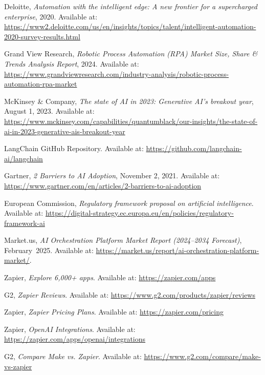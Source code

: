 \documentclass[11pt, a4paper, oneside]{article}
\begin{document}
\begin{thebibliography}{99}
    Deloitte, \textit{Automation with the intelligent edge: A new frontier for a supercharged enterprise}, 2020. Available at: \url{https://www2.deloitte.com/us/en/insights/topics/talent/intelligent-automation-2020-survey-results.html}

    Grand View Research, \textit{Robotic Process Automation (RPA) Market Size, Share \& Trends Analysis Report}, 2024. Available at: \url{https://www.grandviewresearch.com/industry-analysis/robotic-process-automation-rpa-market}

    McKinsey \& Company, \textit{The state of AI in 2023: Generative AI’s breakout year}, August 1, 2023. Available at: \url{https://www.mckinsey.com/capabilities/quantumblack/our-insights/the-state-of-ai-in-2023-generative-ais-breakout-year}


    LangChain GitHub Repository. Available at: \url{https://github.com/langchain-ai/langchain}

    Gartner, \textit{2 Barriers to AI Adoption}, November 2, 2021. Available at: \url{https://www.gartner.com/en/articles/2-barriers-to-ai-adoption}

    European Commission, \textit{Regulatory framework proposal on artificial intelligence}. Available at: \url{https://digital-strategy.ec.europa.eu/en/policies/regulatory-framework-ai}
    
    Market.us, \textit{AI Orchestration Platform Market Report (2024--2034 Forecast)}, February~2025. Available at: \url{https://market.us/report/ai-orchestration-platform-market/}.

    Zapier, \textit{Explore 6,000+ apps}. Available at: \url{https://zapier.com/apps}

    G2, \textit{Zapier Reviews}. Available at: \url{https://www.g2.com/products/zapier/reviews}

    Zapier, \textit{Zapier Pricing Plans}. Available at: \url{https://zapier.com/pricing}


    Zapier, \textit{OpenAI Integrations}. Available at: \url{https://zapier.com/apps/openai/integrations}

    G2, \textit{Compare Make vs. Zapier}. Available at: \url{https://www.g2.com/compare/make-vs-zapier}



\end{thebibliography}
\end{document}
